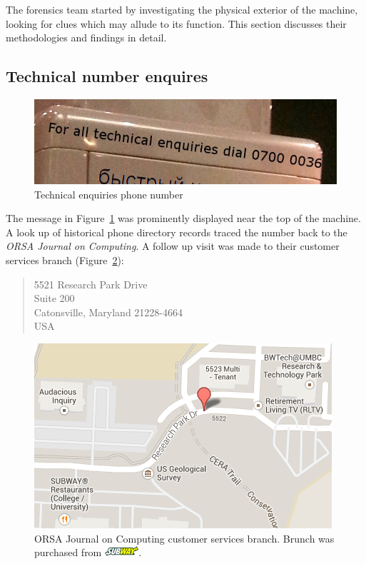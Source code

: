 The forensics team started by investigating the physical exterior of the machine, looking for clues which may allude to its function. This section discusses their methodologies and findings in detail.


\subsection{Technical number enquires}

\begin{figure}[h]
	\centering
	\includegraphics[width=0.8\columnwidth]{img/phone-enquiries.jpg}
	\caption{Technical enquiries phone number}
	\label{fig:technical-enquiries}
\end{figure}

The message in Figure~\ref{fig:technical-enquiries} was prominently displayed near the top of the machine. A look up of historical phone directory records traced the number back to the \emph{ORSA Journal on Computing}. 
A follow up visit was made to their customer services branch (Figure~\ref{fig:orsa-map}):

\begin{quote}
5521 Research Park Drive \\
Suite 200 \\
Catonsville, Maryland 21228-4664 \\
USA
\end{quote}

\begin{figure}[h]
	\centering
	\includegraphics[width=0.95\columnwidth]{img/orsa.png}
	\caption{ORSA Journal on Computing customer services branch. Brunch was purchased from \protect \includegraphics[height=0.98em,keepaspectratio]{img/subway.png}.}
	\label{fig:orsa-map}
\end{figure}

